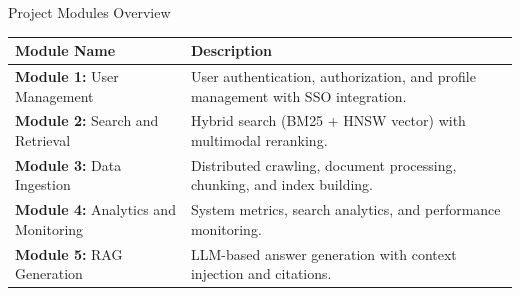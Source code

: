 \documentclass[aspectratio=169,xcolor=dvipsnames]{beamer}
\begin{document}
\begin{frame}{Project Modules Overview}
    \footnotesize
    \begin{table}
        \centering
        \renewcommand{\arraystretch}{1.15}
        \begin{tabular}{p{}|p{}}
        \toprule
        \textbf{Module Name} & \textbf{Description} \\
        \midrule
        \textbf{Module 1:} User Management & User authentication, authorization, and profile management with SSO integration. \\
        \midrule
        \textbf{Module 2:} Search and Retrieval & Hybrid search (BM25 + HNSW vector) with multimodal reranking. \\
        \midrule
        \textbf{Module 3:} Data Ingestion & Distributed crawling, document processing, chunking, and index building. \\
        \midrule
        \textbf{Module 4:} Analytics and Monitoring & System metrics, search analytics, and performance monitoring. \\
        \midrule
        \textbf{Module 5:} RAG Generation & LLM-based answer generation with context injection and citations. \\
        \bottomrule
        \end{tabular}
    \end{table}
\end{frame}
\end{document}
